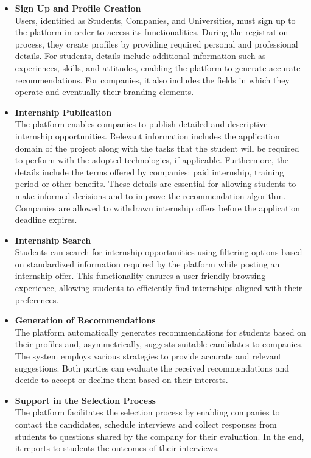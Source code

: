\begin{itemize}

    \item \textbf{Sign Up and Profile Creation} \\
    Users, identified as Students, Companies, and Universities, must sign up to the platform in order to access its functionalities. During the registration process, they create profiles by providing required personal and professional details. For students, details include additional information such as experiences, skills, and attitudes, enabling the platform to generate accurate recommendations.
    For companies, it also includes the fields in which they operate and eventually their branding elements.

    \item \textbf{Internship Publication} \\
    The platform enables companies to publish detailed and descriptive internship opportunities.
    Relevant information includes the application domain of the project along with the tasks that the student will be required to perform with the adopted technologies, if applicable.
    Furthermore, the details include the terms offered by companies: paid internship, training period or other benefits.
    These details are essential for allowing students to make informed decisions and to improve the recommendation algorithm. Companies are allowed to withdrawn internship offers before the application deadline expires.

    \item \textbf{Internship Search} \\
    Students can search for internship opportunities using filtering options based on standardized information required by the platform while posting an internship offer. This functionality ensures a user-friendly browsing experience, allowing students to efficiently find internships aligned with their preferences.

    \item \textbf{Generation of Recommendations} \\
    The platform automatically generates recommendations for students based on their profiles and, asymmetrically, suggests suitable candidates to companies. 
    The system employs various strategies to provide accurate and relevant suggestions.
    Both parties can evaluate the received recommendations and decide to accept or decline them based on their interests.

    \item \textbf{Support in the Selection Process} \\
    The platform facilitates the selection process by enabling companies to contact the candidates, schedule interviews and collect responses from students to questions shared by the company for their evaluation. In the end, it reports to students the outcomes of their interviews.


\end{itemize}
